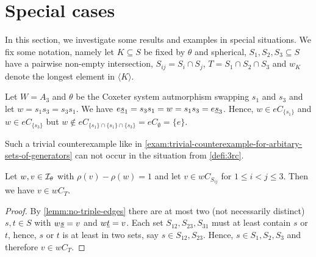 \section{Special cases}
\label{sec:3rc-special-cases}

%
%		

In this section, we investigate some results and examples in special situations. We fix some notation, namely let $K \subseteq S$ be fixed by $\theta$ and spherical, $S_1,S_2,S_3 \subseteq S$ have a pairwise non-empty intersection, $S_{ij} = S_i \cap S_j$, $T = S_1 \cap S_2 \cap S_3$ and $w_K$ denote the longest element in $\langle K \rangle$.

\begin{exam}
	Let $W = A_3$ and $\theta$ be the Coxeter system autmorphism swapping $s_1$ and $s_3$ and let $w = s_1s_3 = s_3s_1$. We have $e \underline{s}_1 = s_3 s_1 = w = s_1 s_3 = e \underline{s}_3$. Hence, $w \in eC_{\{s_1\}}$ and $w \in eC_{\{s_3\}}$ but $w \notin eC_{\{s_1\} \cap \{s_1\} \cap \{s_3\}} = eC_\emptyset = \{e\}$.
\end{exam}

Such a trivial counterexample like in \ref{exam:trivial-counterexample-for-arbitary-sets-of-generators} can not occur in the situation from \ref{defi:3rc}.

\begin{prop}
	Let $w,v \in \mathcal{I}_{\theta}$ with $\rho(v) - \rho(w) = 1$ and let $v \in w C_{S_{ij}}$ for $1 \leq i < j \leq 3$. Then we have $v \in wC_T$.

	\begin{proof}
		By \ref{lemm:no-triple-edges} there are at most two (not necessarily distinct) $s,t \in S$ with $w \underline{s} = v$ and $w \underline{t} = v$. Each set $S_{12},S_{23},S_{31}$ must at least contain $s$ or $t$, hence, $s$ or $t$ is at least in two sets, say $s \in S_{12},S_{23}$. Hence, $s \in S_1,S_2,S_3$ and therefore $v \in wC_T$.
	\end{proof}
\end{prop}


